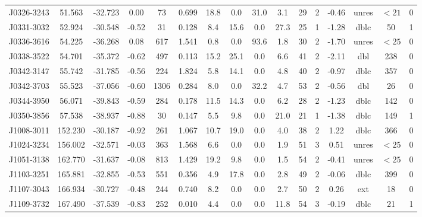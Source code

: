 \documentclass{mnras}
\begin{document}
\begin{table*}
\begin{tabular}{cccccccccccccccc}
J0326-3243 & 51.563 & -32.723 & 0.00 & 73 & 0.699 & 18.8 & 0.0 & 31.0 & 3.1 & 29 & 2 & -0.46 & unres & $<21$ & 0 \\ 

J0331-3032 & 52.924 & -30.548 & -0.52 & 31 & 0.128 & 8.4 & 15.6 & 0.0 & 27.3 & 25 & 1 & -1.28 & dblc & 50 & 1 \\ 

J0336-3616 & 54.225 & -36.268 & 0.08 & 617 & 1.541 & 0.8 & 0.0 & 93.6 & 1.8 & 30 & 2 & -1.70 & unres & $<25$ & 0 \\ 

J0338-3522 & 54.701 & -35.372 & -0.62 & 497 & 0.113 & 15.2 & 25.1 & 0.0 & 6.6 & 41 & 2 & -2.11 & dbl & 238 & 0 \\ 

J0342-3147 & 55.742 & -31.785 & -0.56 & 224 & 1.824 & 5.8 & 14.1 & 0.0 & 4.8 & 40 & 2 & -0.97 & dblc & 357 & 0 \\ 

J0342-3703 & 55.523 & -37.056 & -0.60 & 1306 & 0.284 & 8.0 & 0.0 & 32.2 & 4.7 & 53 & 2 & -0.56 & dbl & 26 & 0 \\ 

J0344-3950 & 56.071 & -39.843 & -0.59 & 284 & 0.178 & 11.5 & 14.3 & 0.0 & 6.2 & 28 & 2 & -1.23 & dblc & 142 & 0 \\ 

J0350-3856 & 57.538 & -38.937 & -0.88 & 30 & 0.147 & 5.5 & 9.8 & 0.0 & 21.0 & 21 & 1 & -1.38 & dblc & 149 & 1 \\ 

J1008-3011 & 152.230 & -30.187 & -0.92 & 261 & 1.067 & 10.7 & 19.0 & 0.0 & 4.0 & 38 & 2 & 1.22 & dblc & 366 & 0 \\ 

J1024-3234 & 156.002 & -32.571 & -0.03 & 363 & 1.568 & 6.6 & 0.0 & 0.0 & 1.9 & 51 & 3 & 0.51 & unres & $<25$ & 0 \\ 

J1051-3138 & 162.770 & -31.637 & -0.08 & 813 & 1.429 & 19.2 & 9.8 & 0.0 & 1.5 & 54 & 2 & -0.41 & unres & $<25$ & 0 \\ 

J1103-3251 & 165.881 & -32.855 & -0.53 & 551 & 0.356 & 4.9 & 17.8 & 0.0 & 2.8 & 49 & 2 & -0.06 & dblc & 399 & 0 \\ 

J1107-3043 & 166.934 & -30.727 & -0.48 & 244 & 0.740 & 8.2 & 0.0 & 0.0 & 2.7 & 50 & 2 & 0.26 & ext & 18 & 0 \\ 

J1109-3732 & 167.490 & -37.539 & -0.83 & 252 & 0.010 & 4.4 & 0.0 & 0.0 & 11.8 & 54 & 3 & -0.19 & dblc & 21 & 1 \\ 


\end{tabular}
\end{table*}
\end{document}

